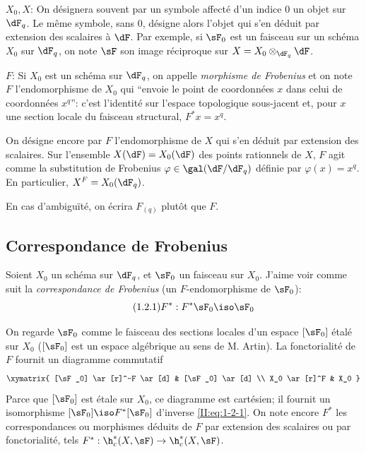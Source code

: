 $X_0,X$: On désignera souvent par un symbole affecté d'un indice $0$ un objet 
sur $\dF_q$. Le même symbole, sans $0$, désigne alors l'objet qui s'en déduit 
par extension des scalaires à $\dF$. Par exemple, si $\sF_0$ est un faisceau 
sur un schéma $X_0$ sur $\dF_q$, on note $\sF$ son image réciproque sur 
$X=X_0\otimes_{\dF_q} \dF$. 

$F$: Si $X_0$ est un schéma sur $\dF_q$, on appelle \emph{morphisme de 
Frobenius} et on note $F$ l'endomorphisme de $X_0$ qui ``envoie le point de 
coordonnées $x$ dans celui de coordonnées $x^q$'': c'est l'identité sur 
l'espace topologique sous-jacent et, pour $x$ une section locale du faisceau 
structural, $F^* x = x^q$. 

On désigne encore par $F$ l'endomorphisme de $X$ qui s'en déduit par 
extension des scalaires. Sur l'ensemble $X(\dF) = X_0(\dF)$ des points 
rationnels de $X$, $F$ agit comme la substitution de Frobenius 
$\varphi\in\gal(\dF/\dF_q)$ définie par $\varphi(x)=x^q$. En particulier, 
$X^F=X_0(\dF_q)$. 

En cas d'ambiguïté, on écrira $F_{(q)}$ plutôt que $F$. 










\subsection{Correspondance de Frobenius}\label{II:1-2}

Soient $X_0$ un schéma sur $\dF_q$, et $\sF_0$ un faisceau sur $X_0$. J'aime 
voir comme suit la \emph{correspondance de Frobenius} (un $F$-endomorphisme de 
$\sF_0$): 
\begin{equation*}\tag{1.2.1}\label{II:eq:1-2-1}
  F^* : F^*\sF_0 \iso \sF_0
\end{equation*}

On regarde $\sF_0$ comme le faisceau des sections locales d'un espace 
$[\sF_0]$ étalé sur $X_0$ ($[\sF_0]$ est un espace algébrique au sens de M. 
Artin). La fonctorialité de $F$ fournit un diagramme commutatif 
\[\xymatrix{
  [\sF_0] \ar[r]^-F \ar[d]
    & [\sF_0] \ar[d] \\
  X_0 \ar[r]^F 
    & X_0
}\]
Parce que $[\sF_0]$ est étale sur $X_0$, ce diagramme est cartésien; il fournit 
un isomorphisme $[\sF_0]\iso F^*[\sF_0]$ d'inverse \eqref{II:eq:1-2-1}. On note 
encore $F^*$ les correspondances ou morphismes déduits de $F$ par extension 
des scalaires ou par fonctorialité, tels 
$F^*:\h_c^*(X,\sF)\to \h_c^*(X,\sF)$. 

